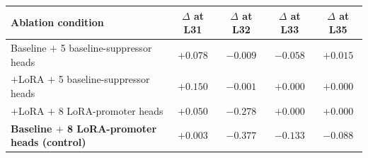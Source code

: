 \begin{tabular}{lcccc}
\toprule
\textbf{Ablation condition} & \textbf{$\Delta$ at L31} & \textbf{$\Delta$ at L32} & \textbf{$\Delta$ at L33} & \textbf{$\Delta$ at L35} \\
\midrule
Baseline $+$ 5 baseline-suppressor heads        & $+0.078$ & $-0.009$ & $-0.058$ & $+0.015$ \\
$+$LoRA   $+$ 5 baseline-suppressor heads        & $+0.150$ & $-0.001$ & $+0.000$ & $+0.000$ \\
$+$LoRA   $+$ 8 LoRA-promoter heads             & $+0.050$ & $-0.278$ & $+0.000$ & $+0.000$ \\
\textbf{Baseline $+$ 8 LoRA-promoter heads (control)} & $+0.003$ & $\mathbf{-0.377}$ & $-0.133$ & $-0.088$ \\
\bottomrule
\end{tabular}
